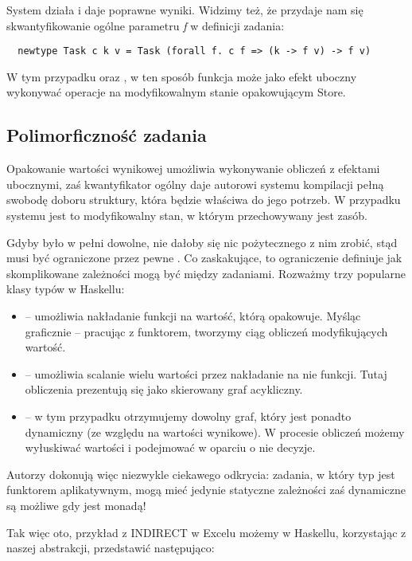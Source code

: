 System działa i daje poprawne wyniki. Widzimy też, że przydaje nam się skwantyfikowanie ogólne parametru \textit{f} w definicji zadania:

\begin{lstlisting}
  newtype Task c k v = Task (forall f. c f => (k -> f v) -> f v)
\end{lstlisting}

W tym przypadku  oraz , w ten sposób funkcja  może jako efekt uboczny wykonywać operacje na modyfikowalnym stanie opakowującym Store.

\subsection{Polimorficzność zadania}

Opakowanie wartości wynikowej umożliwia wykonywanie obliczeń z efektami ubocznymi, zaś kwantyfikator ogólny daje autorowi systemu kompilacji pełną swobodę doboru struktury, która będzie właściwa do jego potrzeb. W przypadku systemu  jest to modyfikowalny stan, w którym przechowywany jest zasób.

Gdyby  było w pełni dowolne, nie dałoby się nic pożytecznego z nim zrobić, stąd musi być ograniczone przez pewne . Co zaskakujące, to ograniczenie definiuje jak skomplikowane zależności mogą być między zadaniami. Rozważmy trzy popularne klasy typów w Haskellu:
\begin{itemize}
\item {} -- umożliwia nakładanie funkcji na wartość, którą opakowuje. Myśląc graficznie -- pracując z funktorem, tworzymy ciąg obliczeń modyfikujących wartość.
\item {} -- umożliwia scalanie wielu wartości przez nakładanie na nie funkcji. Tutaj obliczenia prezentują się jako skierowany graf acykliczny.
\item {} -- w tym przypadku otrzymujemy dowolny graf, który jest ponadto dynamiczny (ze względu na wartości wynikowe). W procesie obliczeń możemy wyłuskiwać wartości i podejmować w oparciu o nie decyzje.
\end{itemize}

Autorzy dokonują więc niezwykle ciekawego odkrycia: zadania, w który typ  jest funktorem aplikatywnym, mogą mieć jedynie statyczne zależności zaś dynamiczne są możliwe gdy  jest monadą!

Tak więc oto, przykład z INDIRECT w Excelu możemy w Haskellu, korzystając z naszej abstrakcji, przedstawić następująco:

